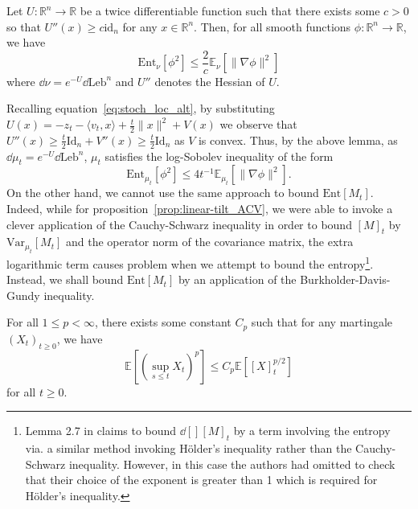 \begin{lemma}\label{lem:entropy_BL}
  Let \(U : \mathbb{R}^n \to \mathbb{R}\) be a twice differentiable function such that
  there exists some \(c > 0\) so that \(U''(x) \ge c\text{id}_n\) for any \(x \in \mathbb{R}^n\). 
  Then, for all smooth functions
  \(\phi : \mathbb{R}^n \to \mathbb{R}\), we have 
  \[\text{Ent}_\nu[\phi^2] \le \frac{2}{c}\mathbb{E}_\nu[\|\nabla\phi\|^2]\]
  where \(\dd \nu = e^{-U} \dd \text{Leb}^n\) and \(U''\) denotes the Hessian of \(U\).
\end{lemma}

Recalling equation~\eqref{eq:stoch_loc_alt}, by substituting \(U(x) = - z_t - \langle v_t, x\rangle + \frac{t}{2}\|x\|^2 + V(x)\)
we observe that \(U''(x) \ge \frac{t}{2}\text{Id}_n + V''(x) \ge \frac{t}{2}\text{Id}_n\) as \(V\) is convex.
Thus, by the above lemma, as \(\dd \mu_t = e^{-U} \dd \text{Leb}^n\), \(\mu_t\) satisfies the log-Sobolev 
inequality of the form
\begin{equation}
  \text{Ent}_{\mu_t}[\phi^2] \le 4t^{-1} \mathbb{E}_{\mu_t}[\|\nabla \phi\|^2].
\end{equation} 
On the other hand, we cannot use the same approach to bound \(\text{Ent}[M_t]\). Indeed, while for 
proposition~\ref{prop:linear-tilt_ACV}, we were able to invoke a clever application of the Cauchy-Schwarz inequality 
in order to bound \([M]_t\) by \(\text{Var}_{\mu_t}[M_t]\) and the operator norm of the covariance matrix, the extra logarithmic term causes problem 
when we attempt to bound the entropy\footnote{Lemma 2.7 in \cite{Lee_2017} claims to bound \(\dd[] [M]_t\) by 
a term involving the entropy via. a similar method invoking Hölder's inequality rather than the Cauchy-Schwarz inequality. However,
in this case the authors had omitted to check that their choice of the exponent is greater than 1 which is required for Hölder's inequality.}. 
Instead, we shall bound \(\text{Ent}[M_t]\) by an application of the Burkholder-Davis-Gundy inequality. 

\begin{lemma}
  For all \(1 \le p < \infty\), there exists some constant \(C_p\) such that for any martingale \((X_t)_{t \ge 0}\),
  we have 
  \[\mathbb{E}\left[\left(\sup_{s \le t} X_t\right)^p\right] \le C_p \mathbb{E}\left[[X]_t^{p / 2}\right]\]
  for all \(t \ge 0\).
\end{lemma}

